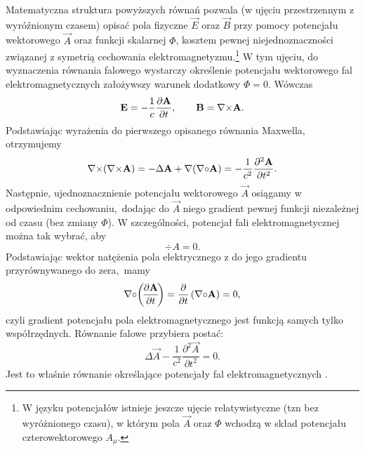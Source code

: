 Matematyczna struktura powyższych równań pozwala (w ujęciu przestrzennym z wyróźnionym czasem) opisać pola fizyczne $\vec{E}$ oraz $\vec{B}$ przy pomocy potencjału wektorowego $\vec{A}$ oraz funkcji skalarnej $\Phi$, kosztem pewnej niejednoznaczności związanej z symetrią cechowania elektromagnetyzmu.\footnote{W języku potencjałów istnieje jeszcze ujęcie relatywistyczne (tzn bez wyróżnionego czasu), w którym pola $\vec{A}$ oraz $\Phi$ wchodzą w skład potencjału czterowektorowego $A_{\mu}$.}
W tym ujęciu, do wyznaczenia równania falowego wystarczy określenie potencjału wektorowego fal elektromagnetycznych założywszy warunek dodatkowy $\Phi=0$. Wówczas
%
$${\bf E}=-\frac{1}{c}\frac{\partial {\bf A}}{\partial t},\qquad {\bf B}={\bf \nabla}{\times}{\bf A}.$$    
%
Podstawiając wyrażenia do pierwszego opisanego równania Maxwella, otrzymujemy
%
$${\bf \nabla}{\times}{\bf \left({{\bf \nabla}{\times}{\bf A}}\right)}=-\Delta{\bf A}+ {\bf \nabla}{\left({{\bf \nabla}{\circ}{\bf {\bf A}}}\right)}=-\frac{1}{c^2}\frac{\partial^2 {\bf A}}{\partial t^2}.$$
%
Następnie, ujednoznacznienie potencjału wektorowego $\vec{A}$ osiągamy w odpowiednim cechowaniu,~dodając do $\vec{A}$ niego gradient pewnej funkcji niezależnej od czasu (bez zmiany $\Phi$).  W szczególności, potencjał fali elektromagnetycznej można tak wybrać, aby
%
$$\div{A}=0.$$
%
Podstawiając wektor natężenia pola elektrycznego z do jego gradientu przyrównywanego do zera,~mamy
%
$${\bf \nabla}{\circ}{\bf {\bf }}\!\left({\!\frac{\partial {\bf A}}{\partial t}\!}\right)=\frac{\partial}{\partial t}\left({{\bf \nabla}{\circ}{\bf {\bf A}}}\right)=0,$$
%
czyli gradient potencjału pola elektromagnetycznego jest funkcją samych tylko współrzędnych. Równanie falowe przybiera postać:
%
$$\Delta\vec{A}-\frac{1}{c^2}\frac{\partial^2 \vec{A}}{\partial t^2}=0.$$
%
Jest to właśnie równanie określające potencjały fal elektromagnetycznych \cite{TeoriaPolaLifszyc}.
